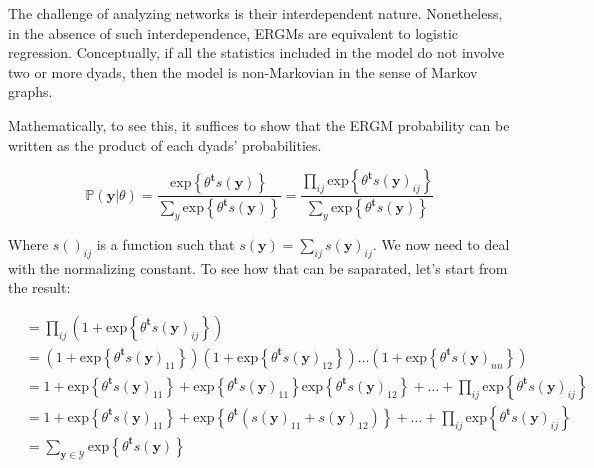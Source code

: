 \documentclass[
]{book}
\begin{document}
The challenge of analyzing networks is their interdependent nature. Nonetheless, in the absence of such interdependence, ERGMs are equivalent to logistic regression. Conceptually, if all the statistics included in the model do not involve two or more dyads, then the model is non-Markovian in the sense of Markov graphs.

Mathematically, to see this, it suffices to show that the ERGM probability can be written as the product of each dyads' probabilities.

\begin{equation*}
{\mathbb{P}\left(\mathbf{y} | \theta\right) } = \frac{\mbox{exp}\left\{{\theta}^\mathbf{t}s\left(\mathbf{y}\right)\right\}}{\sum_{y}\mbox{exp}\left\{{\theta}^\mathbf{t}s\left(\mathbf{y}\right)\right\}} 
= \frac{\prod_{ij}\mbox{exp}\left\{{\theta}^\mathbf{t}s\left(\mathbf{y}\right)_{ij}\right\}}{\sum_{y}\mbox{exp}\left\{{\theta}^\mathbf{t}s\left(\mathbf{y}\right)\right\}}
\end{equation*}

Where \(s\left(\right)_{ij}\) is a function such that \(s\left(\mathbf{y}\right) = \sum_{ij}{s\left(\mathbf{y}\right)_{ij}}\). We now need to deal with the normalizing constant. To see how that can be saparated, let's start from the result:

\newcommand{\thetaS}[1]{\exp{\transpose{\theta}\s{\mathbf{y}}_{#1}}}

\begin{align*}
& =\prod_{ij}\left(1 + \mbox{exp}\left\{{\theta}^\mathbf{t}s\left(\mathbf{y}\right)_{ij}\right\}\right) \\
& = \left(1 + \mbox{exp}\left\{{\theta}^\mathbf{t}s\left(\mathbf{y}\right)_{11}\right\}\right)\left(1 + \mbox{exp}\left\{{\theta}^\mathbf{t}s\left(\mathbf{y}\right)_{12}\right\}\right)\dots\left(1 + \mbox{exp}\left\{{\theta}^\mathbf{t}s\left(\mathbf{y}\right)_{nn}\right\}\right) \\
& = 1 + \mbox{exp}\left\{{\theta}^\mathbf{t}s\left(\mathbf{y}\right)_{11}\right\} + \mbox{exp}\left\{{\theta}^\mathbf{t}s\left(\mathbf{y}\right)_{11}\right\}\mbox{exp}\left\{{\theta}^\mathbf{t}s\left(\mathbf{y}\right)_{12}\right\} + \dots + \prod_{ij}\mbox{exp}\left\{{\theta}^\mathbf{t}s\left(\mathbf{y}\right)_{ij}\right\} \\
& = 1 + \mbox{exp}\left\{{\theta}^\mathbf{t}s\left(\mathbf{y}\right)_{11}\right\} + \mbox{exp}\left\{{\theta}^\mathbf{t}\left(s\left(\mathbf{y}\right)_{11} + s\left(\mathbf{y}\right)_{12}\right)\right\} + \dots + \prod_{ij}\mbox{exp}\left\{{\theta}^\mathbf{t}s\left(\mathbf{y}\right)_{ij}\right\} \\
& = \sum_{\mathbf{y}\in\mathcal{Y}}\mbox{exp}\left\{{\theta}^\mathbf{t}s\left(\mathbf{y}\right)\right\}
\end{align*}
\end{document}
